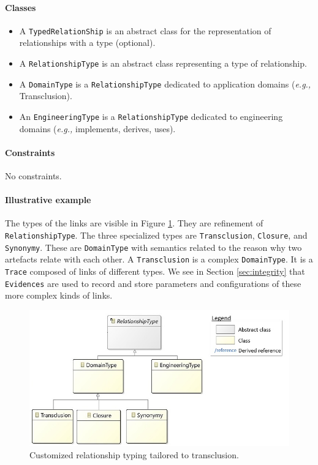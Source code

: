 \paragraph{Classes}
\begin{itemize}
    \item A \texttt{TypedRelationShip} is an abstract class for the representation of relationships with a type (optional).
    \item A \texttt{RelationshipType} is an abstract class representing a type of relationship.
    \item A \texttt{DomainType} is a \texttt{RelationshipType} dedicated to application domains (\textit{e.g.,} Transclusion).
    \item An \texttt{EngineeringType} is a \texttt{RelationshipType} dedicated to engineering domains (\textit{e.g.,} implements, derives, uses).
\end{itemize}


\paragraph{Constraints}
No constraints.


\paragraph{Illustrative example} %
The types of the links are visible in Figure \ref{fig:mm-relationtyping-re-mm}. They are refinement of \texttt{RelationshipType}. %
The three specialized types are \texttt{Transclusion}, \texttt{Closure}, and \texttt{Synonymy}. These are \texttt{DomainType} with semantics related to the reason why two artefacts relate with each other. 
A \texttt{Transclusion} is a complex \texttt{DomainType}. It is a \texttt{Trace} composed of links of different types. We see in Section \ref{sec:integrity} that \texttt{Evidences} are used to record and store parameters and configurations of these more complex kinds of links.

\begin{figure}[ht]
	\centering 
	\includegraphics[width=.8\linewidth]{images/relationtyping-re-mm.jpg}
	\caption{Customized relationship typing tailored to transclusion.}
	\label{fig:mm-relationtyping-re-mm}
\end{figure}







